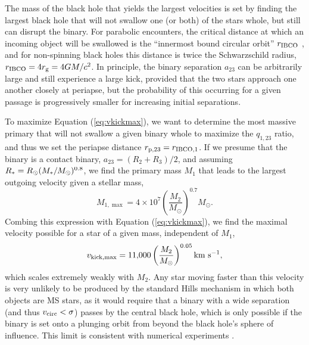 \documentclass[a4paper,twocolumn]{emulateapj}
\begin{document}
{The mass of the black hole that yields the largest velocities is set by finding the largest black hole that will not swallow one (or both) of the stars whole, but still can disrupt the binary. For parabolic encounters, the critical distance at which an incoming object will be swallowed is the ``innermost bound circular orbit'' $r_{\rm IBCO}$ \citep{Bardeen:1972a}, and for non-spinning black holes this distance is twice the Schwarzschild radius, $r_{\rm IBCO} = 4 r_{\rm g} = 4 G M / c^{2}$. In principle, the binary separation $a_{23}$ can be arbitrarily large and still experience a large kick, provided that the two stars approach one another closely at periapse, but the probability of this occurring for a given passage is progressively smaller for increasing initial separations.

To maximize Equation (\ref{eq:vkickmax}), we want to determine the most massive primary that will not swallow a given binary whole to maximize the $q_{1,23}$ ratio, and thus we set the periapse distance $r_{\rm p,23} = r_{\rm IBCO,1}$. If we presume that the binary is a contact binary, $a_{23} = (R_{2} + R_{3})/2$, and assuming $R_{\ast} = R_{\odot} (M_{\ast}/M_{\odot})^{\smash{0.8}}$, we find the primary mass $M_{1}$ that leads to the largest outgoing velocity given a stellar mass,
\begin{equation}
M_{1,\max} = 4 \times 10^{7} \left(\frac{M_{2}}{M_{\odot}}\right)^{0.7} M_{\odot}.
\end{equation}
Combing this expression with Equation (\ref{eq:vkickmax}), we find the maximal velocity possible for a star of a given mass, independent of $M_{1}$,
\begin{equation}
v_{\rm kick,\max} = \textrm{11,000} \left(\frac{M_2}{M_{\odot}}\right)^{0.05} \textrm{km~s$^{-1}$}\label{eq:vkickmax2},
\end{equation}
which scales extremely weakly with $M_{2}$. Any star moving faster than this velocity is very unlikely to be produced by the standard Hills mechanism in which both objects are MS stars, as it would require that a binary with a wide separation (and thus $v_{\rm circ} < \sigma$) passes by the central black hole, which is only possible if the binary is set onto a plunging orbit from beyond the black hole's sphere of influence. This limit is consistent with numerical experiments \citep{Ginsburg:2012a}.

}
\end{document}
